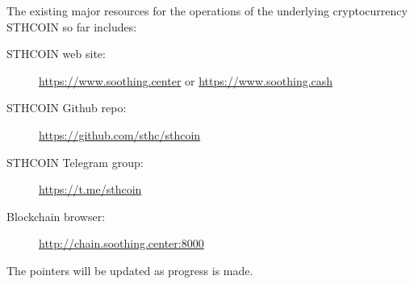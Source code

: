 \documentclass[12pt, a4paper]{article}
\begin{document}
The existing major resources for the operations of the underlying cryptocurrency STHCOIN so far includes:

\begin{description}
\item[STHCOIN web site:] \href{https://www.soothing.center}{https://www.soothing.center} or  \href{https://www.soothing.cash}{https://www.soothing.cash}
\item[STHCOIN Github repo:] \href{https://github.com/sthc/sthcoin}{https://github.com/sthc/sthcoin}
\item[STHCOIN Telegram group:] \href{https://t.me/sthcoin}{https://t.me/sthcoin}
\item[Blockchain browser:] \href{http://chain.soothing.center:8000}{http://chain.soothing.center:8000}
\end{description}

The pointers will be updated as progress is made.
\end{document}
